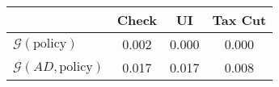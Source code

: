 \begin{tabular}{@{}lccc@{}} 
\toprule 
                          & Check      & UI    & Tax Cut    \\  \midrule 
$\mathcal{G}(\text{policy})$ & 0.002  & 0.000  & 0.000     \\ 
$\mathcal{G}(AD,\text{policy})$ & 0.017  & 0.017  & 0.008     \\ 
\end{tabular}  
